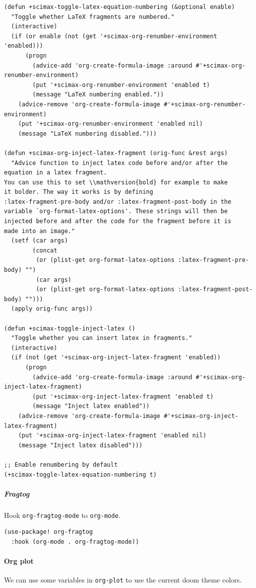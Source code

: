 \documentclass[11pt]{article}
\begin{document}
\begin{verbatim}
(defun +scimax-toggle-latex-equation-numbering (&optional enable)
  "Toggle whether LaTeX fragments are numbered."
  (interactive)
  (if (or enable (not (get '+scimax-org-renumber-environment 'enabled)))
      (progn
        (advice-add 'org-create-formula-image :around #'+scimax-org-renumber-environment)
        (put '+scimax-org-renumber-environment 'enabled t)
        (message "LaTeX numbering enabled."))
    (advice-remove 'org-create-formula-image #'+scimax-org-renumber-environment)
    (put '+scimax-org-renumber-environment 'enabled nil)
    (message "LaTeX numbering disabled.")))

(defun +scimax-org-inject-latex-fragment (orig-func &rest args)
  "Advice function to inject latex code before and/or after the equation in a latex fragment.
You can use this to set \\mathversion{bold} for example to make
it bolder. The way it works is by defining
:latex-fragment-pre-body and/or :latex-fragment-post-body in the
variable `org-format-latex-options'. These strings will then be
injected before and after the code for the fragment before it is
made into an image."
  (setf (car args)
        (concat
         (or (plist-get org-format-latex-options :latex-fragment-pre-body) "")
         (car args)
         (or (plist-get org-format-latex-options :latex-fragment-post-body) "")))
  (apply orig-func args))

(defun +scimax-toggle-inject-latex ()
  "Toggle whether you can insert latex in fragments."
  (interactive)
  (if (not (get '+scimax-org-inject-latex-fragment 'enabled))
      (progn
        (advice-add 'org-create-formula-image :around #'+scimax-org-inject-latex-fragment)
        (put '+scimax-org-inject-latex-fragment 'enabled t)
        (message "Inject latex enabled"))
    (advice-remove 'org-create-formula-image #'+scimax-org-inject-latex-fragment)
    (put '+scimax-org-inject-latex-fragment 'enabled nil)
    (message "Inject latex disabled")))

;; Enable renumbering by default
(+scimax-toggle-latex-equation-numbering t)
\end{verbatim}

\subparagraph{Fragtog}
\label{sec:org25bd34e}
Hook \texttt{org-fragtog-mode} to \texttt{org-mode}.

\begin{verbatim}
(use-package! org-fragtog
  :hook (org-mode . org-fragtog-mode))
\end{verbatim}

\paragraph{Org plot}
\label{sec:orge955263}
We can use some variables in \texttt{org-plot} to use the current doom theme
colors.
\end{document}
